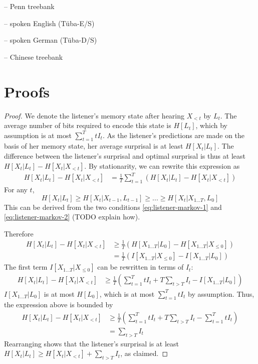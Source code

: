 \documentclass[11pt,letterpaper]{article}
\begin{document}
-- Penn treebank \citep{marcus-building-1993}

-- spoken English (T{\"u}ba-E/S)

-- spoken German (T{\"u}ba-D/S)

-- Chinese treebank \citep{xue-chinese-2013}


\section{Proofs}



\begin{proof}
We denote the listener's memory state after hearing $X_{<t}$ by $L_t$.
The average number of bits required to encode this state is $H[L_t]$, which by assumption is at most $\sum_{t=1}^T t I_t$.
As the listener's predictions are made on the basis of her memory state, her average surprisal is at least $H[X_t | L_t]$.
The difference between the listener's surprisal and optimal surprisal is thus at least $H[X_t | L_t] - H[X_t | X_{<t}]$.
By stationarity, we can rewrite this expression as
\begin{align*}
	H[X_t | L_t] - H[X_t | X_{<t}] &=  \frac{1}{T} \sum_{t=1}^{T} \left(H[X_t | L_t] - H[X_t | X_{<t}]\right) 
\end{align*}
For any $t$,
	$$H[X_t | L_t] \geq H[X_t| X_{t-1}, L_{t-1}] \geq ... \geq H[X_t|X_{1 \dots T}, L_0]$$
	This can be derived from the two conditions \ref{eq:listener-markov-1} and \ref{eq:listener-markov-2} (TODO explain how).

Therefore
\begin{align*}
	H[X_t | L_t] - H[X_t | X_{<t}]& \geq   \frac{1}{T} \left(H[X_{1\dots T} | L_0] - H[X_{1\dots T} | X_{\leq 0}]\right)  \\
	& = \frac{1}{T} \left(I[X_{1\dots T}|X_{\leq 0}] - I[X_{1\dots T}|L_0]\right) 
\end{align*}
	The first term $I[X_{1\dots T}|X_{\leq 0}]$ can be rewritten in terms of $I_t$:
\begin{align*}
	H[X_t | L_t] - H[X_t | X_{<t}]& \geq \frac{1}{T} \left(\sum_{t=1}^T t I_t + T \sum_{t > T} I_t - I[X_{1\dots T}|L_0]\right) 
\end{align*}
	$I[X_{1\dots T}|L_0]$ is at most $H[L_0]$, which is at most $\sum_{t=1}^T t I_t$ by assumption. Thus, the expression above is bounded by
	\begin{align*}
	H[X_t | L_t] - H[X_t | X_{<t}]& \geq \frac{1}{T} \left(\sum_{t=1}^T t I_t + T \sum_{t > T} I_t - \sum_{t=1}^T t I_t\right) \\
		&= \sum_{t > T} I_t
\end{align*}
	Rearranging shows that the listener's surprisal is at least $H[X_t|L_t] \geq H[X_t | X_{<t}] + \sum_{t > T} I_t$, as claimed.
\end{proof}
\end{document}
